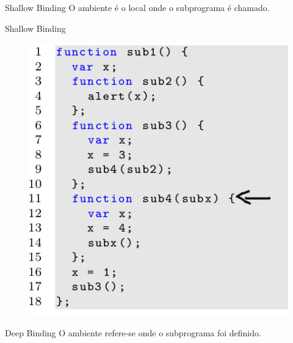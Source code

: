 \begin{frame}{Shallow Binding}
	O ambiente é o local onde o subprograma é chamado.
\end{frame}

\begin{frame}{Shallow Binding}
	\begin{figure}[ht!]
		\centering
		\includegraphics[scale=0.4]{./imgs/js-shallow}
	\end{figure}
\end{frame}

\begin{frame}{Deep Binding}
	O ambiente refere-se onde o subprograma foi definido.
\end{frame}

